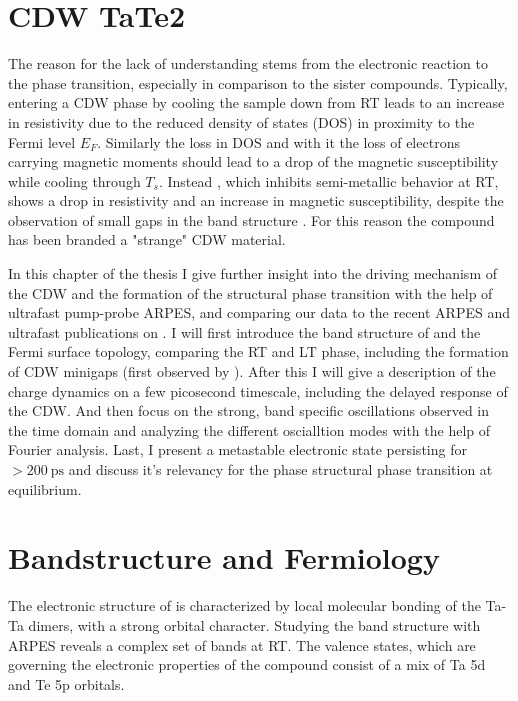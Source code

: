 \section{CDW TaTe2}

The reason for the lack of understanding stems from the electronic reaction to the phase transition, especially in comparison to the  sister compounds.
Typically, entering a CDW phase by cooling the sample down from RT leads to an increase in resistivity due to the reduced density of states (DOS) in proximity to the Fermi level $E_F$.
Similarly the loss in DOS and with it the loss of electrons carrying magnetic moments should lead to a drop of the magnetic susceptibility while cooling through $T_s$.
Instead , which inhibits semi-metallic behavior at RT, shows a drop in resistivity and an increase in magnetic susceptibility, despite the observation of small gaps in the band structure \cite{sorgel_new_2006,hu_optical_2022,lin_evidence_2022}.
For this reason the compound has been branded a "strange" CDW material.

In this chapter of the thesis I give further insight into the driving mechanism of the CDW and the formation of the structural phase transition with the help of ultrafast pump-probe ARPES, and comparing our data to the recent ARPES and ultrafast publications on .
I will first introduce the band structure of  and the Fermi surface topology, comparing the RT and LT phase, including the formation of CDW minigaps (first observed by \cite{lin_evidence_2022}).
After this I will give a description of the charge dynamics on a few picosecond timescale, including the delayed response of the CDW.
And then focus on the strong, band specific oscillations observed in the time domain and analyzing the different oscialltion modes with the help of Fourier analysis.
Last, I present a metastable electronic state persisting for $>\qty{200}{\pico\second}$ and discuss it's relevancy for the phase structural phase transition at equilibrium.

\section{Bandstructure and Fermiology}

The electronic structure of  is characterized by local molecular bonding of the Ta-Ta dimers, with a strong orbital character.
Studying the band structure with ARPES reveals a complex set of bands at RT.
The valence states, which are governing the electronic properties of the compound consist of a mix of Ta 5d and Te 5p orbitals. \cite{mitsuishi_unveiling_2024}

